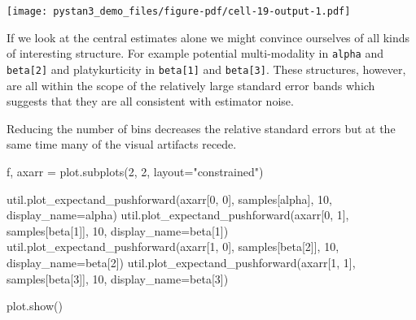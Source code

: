 \documentclass[
  letterpaper,
  DIV=11,
  numbers=noendperiod]{scrartcl}
\newenvironment{Shaded}{\begin{snugshade}}{\end{snugshade}}
\newcommand{\DecValTok}[1]{\textcolor[rgb]{0.68,0.00,0.00}{#1}}
\newcommand{\NormalTok}[1]{\textcolor[rgb]{0.00,0.23,0.31}{#1}}
\newcommand{\OperatorTok}[1]{\textcolor[rgb]{0.37,0.37,0.37}{#1}}
\newcommand{\StringTok}[1]{\textcolor[rgb]{0.13,0.47,0.30}{#1}}
\begin{document}
\texttt{[image: pystan3\_demo\_files/figure-pdf/cell-19-output-1.pdf]}

If we look at the central estimates alone we might convince ourselves of
all kinds of interesting structure. For example potential multi-modality
in \texttt{alpha} and \texttt{beta{[}2{]}} and platykurticity in
\texttt{beta{[}1{]}} and \texttt{beta{[}3{]}}. These structures,
however, are all within the scope of the relatively large standard error
bands which suggests that they are all consistent with estimator noise.

Reducing the number of bins decreases the relative standard errors but
at the same time many of the visual artifacts recede.

\begin{Shaded}
\begin{Highlighting}[]
\NormalTok{f, axarr }\OperatorTok{=}\NormalTok{ plot.subplots(}\DecValTok{2}\NormalTok{, }\DecValTok{2}\NormalTok{, layout}\OperatorTok{=}\StringTok{"constrained"}\NormalTok{)}

\NormalTok{util.plot\_expectand\_pushforward(axarr[}\DecValTok{0}\NormalTok{, }\DecValTok{0}\NormalTok{], samples[}\StringTok{\textquotesingle{}alpha\textquotesingle{}}\NormalTok{], }
                                \DecValTok{10}\NormalTok{, display\_name}\OperatorTok{=}\StringTok{\textquotesingle{}alpha\textquotesingle{}}\NormalTok{)}
\NormalTok{util.plot\_expectand\_pushforward(axarr[}\DecValTok{0}\NormalTok{, }\DecValTok{1}\NormalTok{], samples[}\StringTok{\textquotesingle{}beta[1]\textquotesingle{}}\NormalTok{], }
                                \DecValTok{10}\NormalTok{, display\_name}\OperatorTok{=}\StringTok{\textquotesingle{}beta[1]\textquotesingle{}}\NormalTok{)}
\NormalTok{util.plot\_expectand\_pushforward(axarr[}\DecValTok{1}\NormalTok{, }\DecValTok{0}\NormalTok{], samples[}\StringTok{\textquotesingle{}beta[2]\textquotesingle{}}\NormalTok{], }
                                \DecValTok{10}\NormalTok{, display\_name}\OperatorTok{=}\StringTok{\textquotesingle{}beta[2]\textquotesingle{}}\NormalTok{)}
\NormalTok{util.plot\_expectand\_pushforward(axarr[}\DecValTok{1}\NormalTok{, }\DecValTok{1}\NormalTok{], samples[}\StringTok{\textquotesingle{}beta[3]\textquotesingle{}}\NormalTok{], }
                                \DecValTok{10}\NormalTok{, display\_name}\OperatorTok{=}\StringTok{\textquotesingle{}beta[3]\textquotesingle{}}\NormalTok{)}

\NormalTok{plot.show()}
\end{Highlighting}
\end{Shaded}
\end{document}
